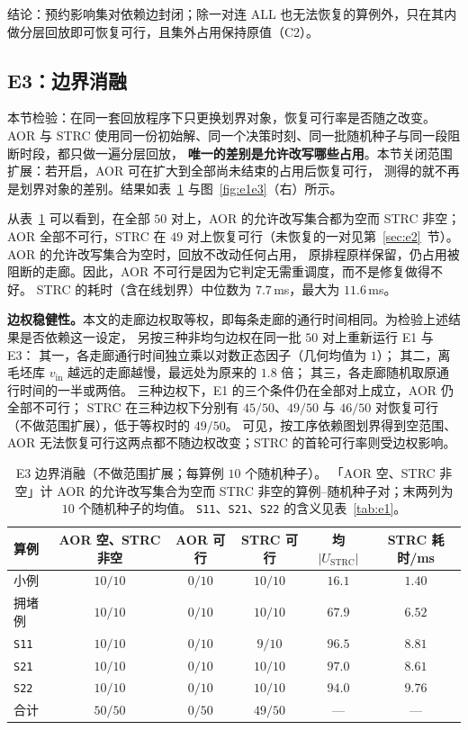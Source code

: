 \documentclass[manuscript,screen,review]{acmart}
\providecommand{\STRC}{\textsc{STRC}}
\newcommand{\NSeeds}{10}
\newcommand{\NPairs}{50}
\newcommand{\FeasRone}{0/\NPairs}            %
\newcommand{\FeasRtwo}{49/\NPairs}           %
\newcommand{\MsRepairMed}{7.7}
\newcommand{\MsRepairMax}{11.6}
\newcommand{\WeightLogRtwo}{45/\NPairs}
\newcommand{\WeightLuRtwo}{49/\NPairs}
\newcommand{\WeightSplitRtwo}{46/\NPairs}
\begin{document}
结论：预约影响集对依赖边封闭；除一对连 ALL 也无法恢复的算例外，只在其内做分层回放即可恢复可行，且集外占用保持原值（C2）。

\subsection{E3：边界消融}
\label{sec:e3}

本节检验：在同一套回放程序下只更换划界对象，恢复可行率是否随之改变。
AOR 与 \STRC{} 使用同一份初始解、同一个决策时刻、同一批随机种子与同一段阻断时段，都只做一遍分层回放，
\textbf{唯一的差别是允许改写哪些占用}。本节关闭范围扩展：若开启，AOR 可在扩大到全部尚未结束的占用后恢复可行，
测得的就不再是划界对象的差别。结果如表~\ref{tab:e3} 与图~\ref{fig:e1e3}（右）所示。

从表~\ref{tab:e3} 可以看到，在全部 \(\NPairs\) 对上，AOR 的允许改写集合都为空而 \STRC{} 非空；
AOR 全部不可行，\STRC{} 在 \(49\) 对上恢复可行（未恢复的一对见第~\ref{sec:e2}~节）。AOR 的允许改写集合为空时，回放不改动任何占用，
原排程原样保留，仍占用被阻断的走廊。因此，AOR 不可行是因为它判定无需重调度，而不是修复做得不好。
\STRC{} 的耗时（含在线划界）中位数为 \(\MsRepairMed\)\,ms，最大为 \(\MsRepairMax\)\,ms。

\textbf{边权稳健性。}本文的走廊边权取等权，即每条走廊的通行时间相同。为检验上述结果是否依赖这一设定，
另按三种非均匀边权在同一批 \(\NPairs\) 对上重新运行 E1 与 E3：
其一，各走廊通行时间独立乘以对数正态因子（几何均值为 \(1\)）；
其二，离毛坯库 \(v_{\mathrm{in}}\) 越远的走廊越慢，最远处为原来的 \(1.8\) 倍；
其三，各走廊随机取原通行时间的一半或两倍。
三种边权下，E1 的三个条件仍在全部对上成立，AOR 仍全部不可行；
\STRC{} 在三种边权下分别有 \(\WeightLogRtwo\)、\(\WeightLuRtwo\) 与 \(\WeightSplitRtwo\) 对恢复可行（不做范围扩展），低于等权时的 \(\FeasRtwo\)。
可见，按工序依赖图划界得到空范围、AOR 无法恢复可行这两点都不随边权改变；\STRC{} 的首轮可行率则受边权影响。

\begin{table}[t]
\centering
\caption{E3 边界消融（不做范围扩展；每算例 \(\NSeeds\) 个随机种子）。
「AOR 空、\STRC{} 非空」计 AOR 的允许改写集合为空而 \STRC{} 非空的算例--随机种子对；末两列为 \(\NSeeds\) 个随机种子的均值。
\texttt{S11}、\texttt{S21}、\texttt{S22} 的含义见表~\ref{tab:e1}。}
\label{tab:e3}
\small
\begin{tabular}{@{}lccccc@{}}
\toprule
算例 & AOR 空、\STRC{} 非空 & AOR 可行 & \STRC{} 可行 & 均 \(|U_{\mathrm{STRC}}|\) & \STRC{} 耗时/ms \\
\midrule
小例   & \(10/10\) & \(0/10\) & \(10/10\) & \(16.1\) & \(1.40\) \\
拥堵例 & \(10/10\) & \(0/10\) & \(10/10\) & \(67.9\) & \(6.52\) \\
\texttt{S11}  & \(10/10\) & \(0/10\) & \(9/10\) & \(96.5\) & \(8.81\) \\
\texttt{S21}    & \(10/10\) & \(0/10\) & \(10/10\) & \(97.0\) & \(8.61\) \\
\texttt{S22}     & \(10/10\) & \(0/10\) & \(10/10\) & \(94.0\) & \(9.76\) \\
\midrule
合计 & \(\NPairs/\NPairs\) & \(\FeasRone\) & \(\FeasRtwo\) & --- & --- \\
\bottomrule
\end{tabular}
\end{table}
\end{document}
